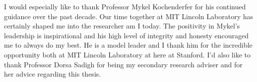 
I would especially like to thank Professor Mykel Kochenderfer for his continued guidance over the past decade.
Our time together at MIT Lincoln Laboratory has certainly shaped me into the researcher am I today.
The positivity in Mykel's leadership is inspirational and his high level of integrity and honesty encouraged me to always do my best.
He is a model leader and I thank him for the incredible opportunity both at MIT Lincoln Laboratory at here at Stanford.
I'd also like to thank Professor Dorsa Sadigh for being my secondary research adviser and for her advice regarding this thesis.


